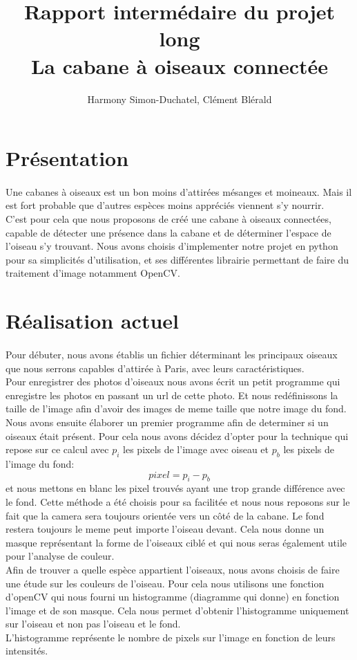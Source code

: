 \documentclass{article}
\title{Rapport intermédaire du projet long \\ La cabane à oiseaux connectée }
\author{Harmony Simon-Duchatel, Clément Blérald}
\begin{document}
\maketitle


\section{Présentation}
\paragraph {}
Une cabanes à oiseaux est un bon moins d'attirées mésanges et moineaux. Mais il est fort probable que d'autres espèces moins appréciés viennent s'y nourrir. \\
C'est pour cela que nous proposons de créé une cabane à oiseaux connectées, capable de détecter une présence dans la cabane et de déterminer l'espace de l'oiseau s'y trouvant. 
Nous avons choisis d'implementer notre projet en python pour sa simplicités d'utilisation, et ses différentes librairie permettant de faire du traitement d'image notamment OpenCV.
\section{Réalisation actuel} 
\paragraph {}
Pour débuter, nous avons établis un fichier déterminant les principaux oiseaux que nous serrons capables d'attirée à Paris, avec leurs caractéristiques. \\
Pour enregistrer des photos d'oiseaux nous avons écrit un petit programme qui enregistre les photos en passant un url de cette photo. Et nous redéfinissons la taille de l'image
afin d'avoir des images de meme taille que notre image du fond.\\
Nous avons ensuite élaborer un premier programme afin de determiner si un oiseaux était présent.
Pour cela nous avons décidez d'opter pour la technique qui repose sur ce calcul  avec $p_{i}$ les pixels de l'image avec oiseau et $p_{b}$ les pixels de l'image du fond: 
$$
pixel = p_{i} - p_{b}
$$
et nous mettons en blanc les pixel trouvés ayant une trop grande différence avec le fond. Cette méthode a été choisis pour sa facilitée et nous nous reposons sur le fait que la camera sera toujours orientée vers un côté de la cabane. Le fond restera toujours le meme peut importe l'oiseau devant. Cela nous donne un masque représentant la forme de l'oiseaux ciblé et qui nous seras également utile pour l'analyse de couleur.\\
Afin de trouver a quelle espèce appartient l'oiseaux, nous avons choisis de faire une étude sur les couleurs de l'oiseau. Pour cela nous utilisons une fonction d'openCV qui nous fourni un histogramme (diagramme qui donne) en fonction l'image et de son masque. Cela nous permet d'obtenir l'histogramme uniquement sur l'oiseau et non pas l'oiseau et le fond. \\
L'histogramme représente le nombre de pixels sur l'image en fonction de leurs intensités.\\
\end{document}
